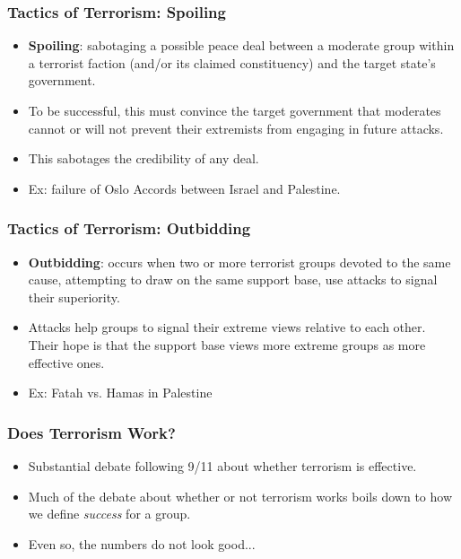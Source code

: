 \documentclass[handout]{beamer}
\begin{document}
\begin{frame} 
	\frametitle{\LARGE{Tactics of Terrorism: Spoiling}}
	\begin{itemize}
		\item \textbf{Spoiling}: sabotaging a possible peace deal between a moderate group within a terrorist faction (and/or its claimed constituency) and the target state's government. \pause 
		
		\item To be successful, this must convince the target government that moderates cannot or will not prevent their extremists from engaging in future attacks. \pause
		\item This sabotages the credibility of any deal.
		\item Ex: failure of Oslo Accords between Israel and Palestine.
	\end{itemize}
\end{frame}

\begin{frame} 
	\frametitle{\LARGE{Tactics of Terrorism: Outbidding}}
	\begin{itemize}
		\item \textbf{Outbidding}: occurs when two or more terrorist groups devoted to the same cause, attempting to draw on the same support base, use attacks to signal their superiority. \pause
		\item Attacks help groups to signal their extreme views relative to each other. Their hope is that the support base views more extreme groups as more effective ones.
		\item Ex: Fatah vs. Hamas in Palestine
		
	\end{itemize}
\end{frame}




\begin{frame} 
\frametitle{\LARGE{Does Terrorism Work?}}
\begin{itemize}
		\item Substantial debate following 9/11 about whether terrorism is effective. \pause 
		\item Much of the debate about whether or not terrorism works boils down to how we define \emph{success} for a group. \pause 
		\item Even so, the numbers do not look good...
\end{itemize}
\end{frame}
\end{document}
